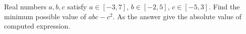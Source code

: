 Real numbers $a, b, c$ satisfy $a\in[-3,7]$, $b\in[-2,5]$, $c\in[-5,3]$. Find the minimum possible value of $abc-c^{2}$. As the answer give the absolute value of computed expression.
